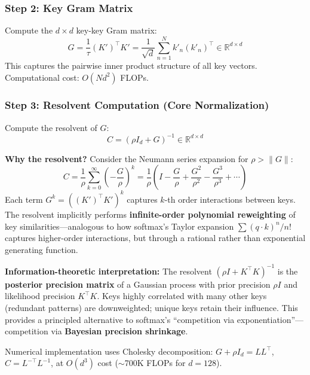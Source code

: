 \documentclass[11pt,a4paper]{article}
\theoremstyle{remark}
\begin{document}
\subsubsection{Step 2: Key Gram Matrix}
Compute the $d \times d$ key-key Gram matrix:
\begin{equation}
G = \frac{1}{\tau} (K')^\top K' = \frac{1}{\sqrt{d}} \sum_{n=1}^N k'_n (k'_n)^\top \in \mathbb{R}^{d \times d}
\label{eq:gram}
\end{equation}
This captures the pairwise inner product structure of all key vectors. Computational cost: $O(Nd^2)$ FLOPs.

\subsubsection{Step 3: Resolvent Computation (Core Normalization)}
Compute the resolvent of $G$:
\begin{equation}
C = (\rho I_d + G)^{-1} \in \mathbb{R}^{d \times d}
\label{eq:resolvent}
\end{equation}

\textbf{Why the resolvent?} Consider the Neumann series expansion for $\rho > \|G\|$:
\begin{equation}
C = \frac{1}{\rho} \sum_{k=0}^{\infty} \left(-\frac{G}{\rho}\right)^k = \frac{1}{\rho}\left(I - \frac{G}{\rho} + \frac{G^2}{\rho^2} - \frac{G^3}{\rho^3} + \cdots\right)
\label{eq:neumann}
\end{equation}
Each term $G^k = ((K')^\top K')^k$ captures $k$-th order interactions between keys. The resolvent implicitly performs \textbf{infinite-order polynomial reweighting} of key similarities---analogous to how softmax's Taylor expansion $\sum (q \cdot k)^n / n!$ captures higher-order interactions, but through a rational rather than exponential generating function.

\textbf{Information-theoretic interpretation:} The resolvent $(\rho I + K^\top K)^{-1}$ is the \textbf{posterior precision matrix} of a Gaussian process with prior precision $\rho I$ and likelihood precision $K^\top K$. Keys highly correlated with many other keys (redundant patterns) are downweighted; unique keys retain their influence. This provides a principled alternative to softmax's ``competition via exponentiation''---competition via \textbf{Bayesian precision shrinkage}.

Numerical implementation uses Cholesky decomposition: $G + \rho I_d = L L^\top$, $C = L^{-\top} L^{-1}$, at $O(d^3)$ cost ($\sim$700K FLOPs for $d=128$).
\end{document}
